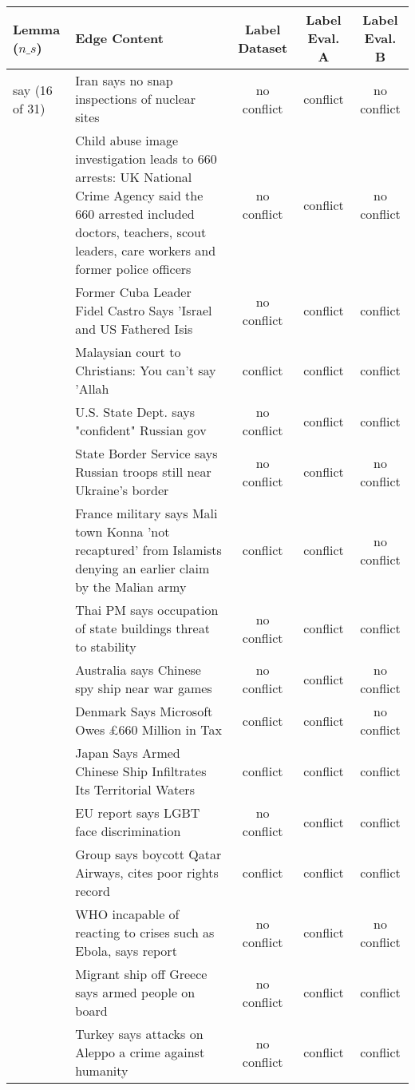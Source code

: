 \begin{sidewaystable}[ht]
\centering
\begin{tabular}{l p{13cm} ccc}
\toprule
Lemma (\(n\_s\)) & Edge Content & Label Dataset & Label Eval. A & Label Eval. B \\
\midrule
say (16 of 31)
& Iran says no snap inspections of nuclear sites & no conflict & conflict & no conflict \\
& Child abuse image investigation leads to 660 arrests: UK National Crime Agency said the 660 arrested included doctors, teachers, scout leaders, care workers and former police officers & no conflict & conflict & no conflict \\
& Former Cuba Leader Fidel Castro Says 'Israel and US Fathered Isis & no conflict & conflict & conflict \\
& Malaysian court to Christians: You can't say 'Allah & conflict & conflict & conflict \\
& U.S. State Dept. says "confident" Russian gov & no conflict & conflict & conflict \\
& State Border Service says Russian troops still near Ukraine's border & no conflict & conflict & no conflict \\
& France military says Mali town Konna 'not recaptured' from Islamists denying an earlier claim by the Malian army & conflict & conflict & no conflict \\
& Thai PM says occupation of state buildings threat to stability & no conflict & conflict & conflict \\
& Australia says Chinese spy ship near war games & no conflict & conflict & no conflict \\
& Denmark Says Microsoft Owes  £660 Million in Tax & conflict & conflict & no conflict \\
& Japan Says Armed Chinese Ship Infiltrates Its Territorial Waters & conflict & conflict & conflict \\
& EU report says LGBT face discrimination & no conflict & conflict & conflict \\
& Group says boycott Qatar Airways, cites poor rights record & conflict & conflict & conflict \\
& WHO incapable of reacting to crises such as Ebola, says report & no conflict & conflict & no conflict \\
& Migrant ship off Greece says armed people on board & no conflict & conflict & conflict \\
& Turkey says attacks on Aleppo a crime against humanity & no conflict & conflict & conflict \\
\bottomrule
\end{tabular}
\caption{Dataset labels and evaluation labels for edges corresponding to predicate lemmas with the highest abs. diff. in precision between the evaluation runs with recall \(> 0\) and number of samples per lemma \(n_s >= 5\) for the evaluation runs \texttt{semsim-fix-lemma cn} at \(t_s = 0.30\) (A) and \texttt{semsim-ctx e5 r-10-2} at \(t_s = 0.72\) (B)  (Num. ten of top ten lemma)}
\label{tab:ples-labels-6}
\end{sidewaystable}


